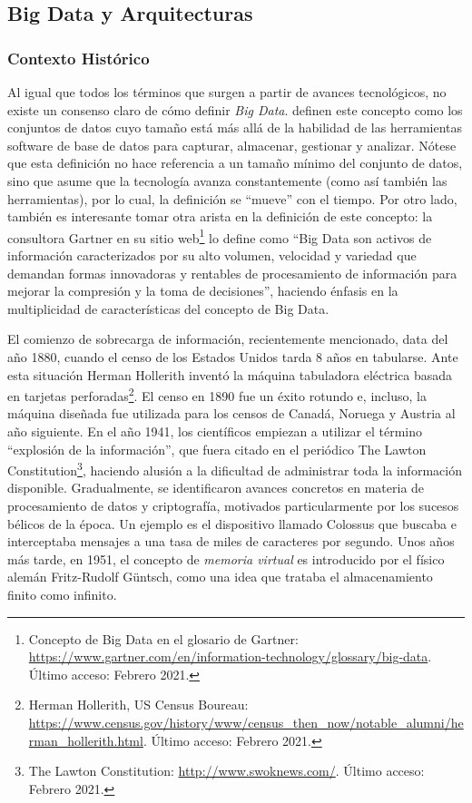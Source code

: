 \subsection{Big Data y Arquitecturas}
\subsubsection{Contexto Histórico}
Al igual que todos los términos que surgen a partir de avances tecnológicos, no existe un consenso claro de cómo definir \textit{Big Data}. \cite{manyika2011big} definen este concepto como los conjuntos de datos cuyo tamaño está más allá de la habilidad de las herramientas software de base de datos para capturar, almacenar, gestionar y analizar. Nótese que esta definición no hace referencia a un tamaño mínimo del conjunto de datos, sino que asume que la tecnología avanza constantemente (como así también las herramientas), por lo cual, la definición se ``mueve'' con el tiempo. Por otro lado, también es interesante tomar otra arista en la definición de este concepto: la consultora Gartner en su sitio web\footnote{Concepto de Big Data en el glosario de Gartner: \url{https://www.gartner.com/en/information-technology/glossary/big-data}. Último acceso: Febrero 2021.} lo define como ``Big Data son activos de información caracterizados por su alto volumen, velocidad y variedad que demandan formas innovadoras y rentables de procesamiento de información para mejorar la compresión y la toma de decisiones'', haciendo énfasis en la multiplicidad de características del concepto de Big Data.

\bigskip El comienzo de sobrecarga de información, recientemente mencionado, data del año 1880, cuando el censo de los Estados Unidos tarda 8 años en tabularse. Ante esta situación Herman Hollerith inventó la máquina tabuladora eléctrica basada en tarjetas perforadas\footnote{Herman Hollerith, US Census Boureau: \url{https://www.census.gov/history/www/census_then_now/notable_alumni/herman_hollerith.html}. Último acceso: Febrero 2021.}. El censo en 1890 fue un éxito rotundo e, incluso, la máquina diseñada fue utilizada para los censos de Canadá, Noruega y Austria al año siguiente. En el año 1941, los científicos empiezan a utilizar el término “explosión de la información”, que fuera citado en el periódico The Lawton Constitution\footnote{The Lawton Constitution: \url{http://www.swoknews.com/}.  Último acceso: Febrero 2021.}, haciendo alusión a la dificultad de administrar toda la información disponible. Gradualmente, se identificaron avances concretos en materia de procesamiento de datos y criptografía, motivados particularmente por los sucesos bélicos de la época. Un ejemplo es el dispositivo llamado Colossus \citep{copeland2004colossus} que buscaba e interceptaba mensajes a una tasa de miles de caracteres por segundo. Unos años más tarde, en 1951, el concepto de \textit{memoria virtual} es introducido por el físico alemán Fritz-Rudolf Güntsch, como una idea que trataba el almacenamiento finito como infinito.

